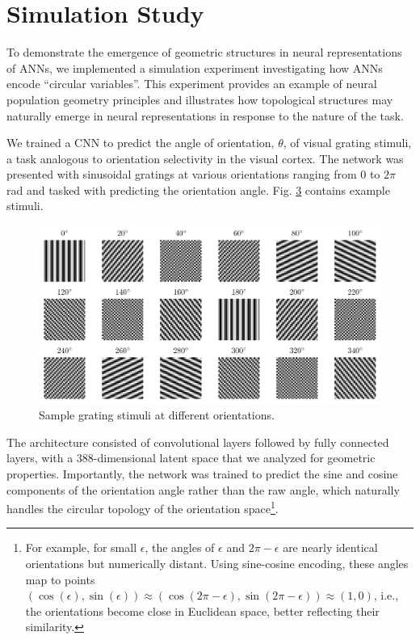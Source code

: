 \documentclass[11pt,a4paper]{article}
\begin{document}
\begin{figure}
\begin{subfigure}[b]{0.48\textwidth}
        \label{fig:mouse_regression}
    \end{subfigure}

    \label{fig:mouse_manifold_analysis}
\end{figure}

\section{Simulation Study}

To demonstrate the emergence of geometric structures in neural representations of ANNs, we implemented a simulation experiment investigating how ANNs encode ``circular variables''. This experiment provides an example of neural population geometry principles and illustrates how topological structures may naturally emerge in neural representations in response to the nature of the task.


We trained a CNN to predict the angle of orientation, $\theta$, of visual grating stimuli, a task analogous to orientation selectivity in the visual cortex. The network was presented with sinusoidal gratings at various orientations ranging from 0 to $2\pi$ rad and tasked with predicting the orientation angle. Fig. \ref{fig:grating_samples} contains example stimuli.

\begin{figure}
    \centering
    \includegraphics[width=\linewidth]{results/grating_samples.pdf}
    \caption{Sample grating stimuli at different orientations.}
    \label{fig:grating_samples}
\end{figure}

The architecture consisted of convolutional layers followed by fully connected layers, with a 388-dimensional latent space that we analyzed for geometric properties. Importantly, the network was trained to predict the sine and cosine components of the orientation angle rather than the raw angle, which naturally handles the circular topology of the orientation space\footnote{For example, for small $\epsilon$, the angles of $\epsilon$ and $2\pi - \epsilon$ are nearly identical orientations but numerically distant. Using sine-cosine encoding, these angles map to points $(\cos(\epsilon), \sin(\epsilon)) \approx (\cos(2\pi-\epsilon), \sin(2\pi - \epsilon)) \approx (1, 0)$, i.e., the orientations become close in Euclidean space, better reflecting their similarity.}.
\end{document}
